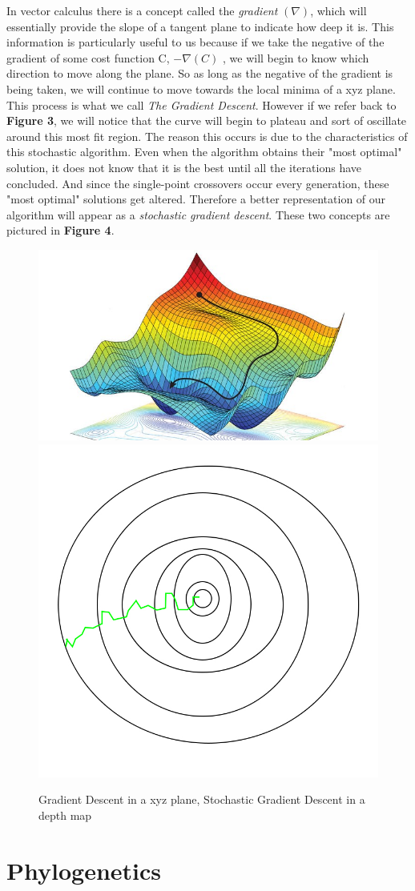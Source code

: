 In vector calculus there is a concept called the \emph{gradient} $ (\nabla) $, which will essentially provide the slope of a tangent plane to indicate how deep it is. 
This information is particularly useful to us because if we take the negative of the gradient of some cost function C, $ -\nabla (C) $ \cite{BB}, we will begin to know which direction to move along the plane. 
So as long as the negative of the gradient is being taken, we will continue to move towards the local minima of a xyz plane. 
This process is what we call \emph{The Gradient Descent}. 
However if we refer back to \textbf{Figure 3}, we will notice that the curve will begin to plateau and sort of oscillate around this most fit region. 
The reason this occurs is due to the characteristics of this stochastic algorithm. 
Even when the algorithm obtains their "most optimal" solution, it does not know that it is the best until all the iterations have concluded. 
And since the single-point crossovers occur every generation, these "most optimal" solutions get altered. 
Therefore a better representation of our algorithm will appear as a \emph{stochastic gradient descent}. 
These two concepts are pictured in \textbf{Figure 4}.   

\begin{figure}[h]
\includegraphics[width=.5\textwidth]{figures/bp.jpg}
\includegraphics[width=.35\textwidth]{figures/sgd-1.jpg}
\caption{Gradient Descent in a xyz plane, Stochastic Gradient Descent in a depth map}
\end{figure}   

\section{Phylogenetics}

